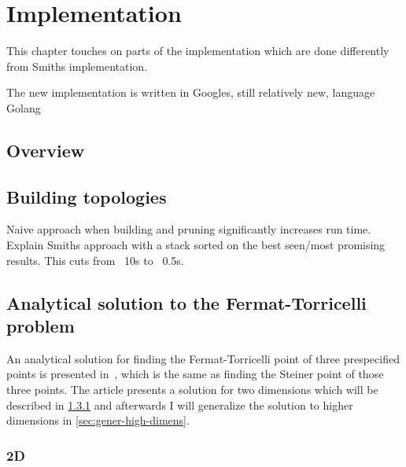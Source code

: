  {
\abnormalparskip{0pt}
\chapter{Implementation}
\label{cha:implementation}
}

This chapter touches on parts of the implementation which are done differently
from Smiths implementation.

The new implementation is written in Googles, still relatively new, language
Golang~\cite{GolangHomepage}

\section{Overview}
\label{sec:overview-1}

\section{Building topologies}
\label{sec:building-topologies}

Naive approach when building and pruning significantly increases run
time. Explain Smiths approach with a stack sorted on the best seen/most
promising results. This cuts from ~10s to ~0.5s.

\section{Analytical solution to the Fermat-Torricelli problem}
\label{sec:analyt-solut-ferm}

An analytical solution for finding the Fermat-Torricelli point of three
prespecified points is presented in~\cite{Uteshev2012}, which is the same as
finding the Steiner point of those three points.  The article presents a
solution for two dimensions which will be described in \cref{sec:2d} and
afterwards I will generalize the solution to higher dimensions
in \cref{sec:gener-high-dimens}.


\subsection{2D}
\label{sec:2d}

